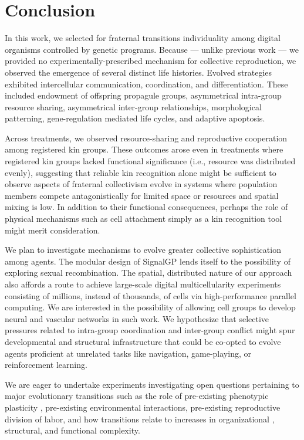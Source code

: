 \section{Conclusion}


In this work, we selected for fraternal transitions individuality among digital organisms controlled by genetic programs.
Because --- unlike previous work --- we provided no experimentally-prescribed mechanism for collective reproduction, we observed the emergence of several distinct life histories. 
Evolved strategies exhibited intercellular communication, coordination, and differentiation.
These included endowment of offspring propagule groups, asymmetrical intra-group resource sharing, asymmetrical inter-group relationships, morphological patterning, gene-regulation mediated life cycles, and adaptive apoptosis.

Across treatments, we observed resource-sharing and reproductive cooperation among registered kin groups.
These outcomes arose even in treatments where registered kin groups lacked functional significance (i.e., resource was distributed evenly), suggesting that reliable kin recognition alone might be sufficient to observe aspects of fraternal collectivism evolve in systems where population members compete antagonistically for limited space or resources and spatial mixing is low.
In addition to their functional consequences, perhaps the role of physical mechanisms such as cell attachment simply as a kin recognition tool might merit consideration.

We plan to investigate mechanisms to evolve greater collective sophistication among agents.
The modular design of SignalGP lends itself to the possibility of exploring sexual recombination.
The spatial, distributed nature of our approach also affords a route to achieve large-scale digital multicellularity experiments consisting of millions, instead of thousands, of cells via high-performance parallel computing.
We are interested in the possibility of allowing cell groups to develop neural and vascular networks in such work.
We hypothesize that selective pressures related to intra-group coordination and inter-group conflict might spur developmental and structural infrastructure that could be co-opted to evolve agents proficient at unrelated tasks like navigation, game-playing, or reinforcement learning.

We are eager to undertake experiments investigating open questions pertaining to major evolutionary transitions such as the role of pre-existing phenotypic plasticity \citep{clune2007investigating, lalejini2016evolutionary}, pre-existing environmental interactions, pre-existing reproductive division of labor, and how transitions relate to increases in organizational \citep{goldsby2012task}, structural, and functional \citep{goldsby2014evolutionary} complexity.
